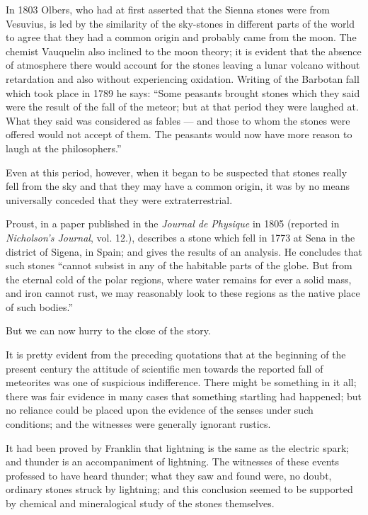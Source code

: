 \documentclass[a4paper, 11pt, oneside]{article}
\begin{document}
In 1803 Olbers, who had at first asserted that the Sienna stones were from Vesuvius, is led by the similarity of the sky-stones in different parts of the world to agree that they had a common origin and probably came from the moon. The chemist Vauquelin also inclined to the moon theory; it is evident that the absence of atmosphere there would account for the stones leaving a lunar volcano without retardation and also without experiencing oxidation. Writing of the Barbotan fall which took place in 1789 he says: ``Some peasants brought stones which they said were the result of the fall of the meteor; but at that period they were laughed at. What they said was considered as fables --- and those to whom the stones were offered would not accept of them. The peasants would now have more reason to laugh at the philosophers.'' 

Even at this period, however, when it began to be suspected that stones really fell from the sky and that they may have a common origin, it was by no means universally conceded that they were extraterrestrial.

Proust, in a paper published in the \emph{Journal de Physique} in 1805 (reported in \emph{Nicholson's Journal}, vol. 12.), describes a stone which fell in 1773 at Sena in the district of Sigena, in Spain; and gives the results of an analysis. He concludes that such stones ``cannot subsist in any of the habitable parts of the globe. But from the eternal cold of the polar regions, where water remains for ever a solid mass, and iron cannot rust, we may reasonably look to these regions as the native place of such bodies.''

But we can now hurry to the close of the story.

It is pretty evident from the preceding quotations that at the beginning of the present century the attitude of scientific men towards the reported fall of meteorites was one of suspicious indifference. There might be something in it all; there was fair evidence in many cases that something startling had happened; but no reliance could be placed upon the evidence of the senses under such conditions; and the witnesses were generally ignorant rustics.

It had been proved by Franklin that lightning is the same as the electric spark; and thunder is an accompaniment of lightning. The witnesses of these events professed to have heard thunder; what they saw and found were, no doubt, ordinary stones struck by lightning; and this conclusion seemed to be supported by chemical and mineralogical study of the stones themselves.
\end{document}

